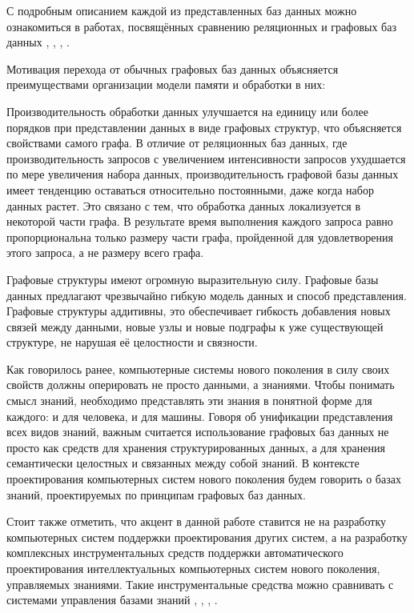 С подробным описанием каждой из представленных баз данных можно ознакомиться в работах, посвящённых сравнению  реляционных и графовых баз данных , , , .

Мотивация перехода от обычных графовых баз данных объясняется преимуществами организации модели памяти и обработки в них:
\begin{textitemize}
    \item Производительность обработки данных улучшается на единицу или более порядков при представлении данных в виде графовых структур, что объясняется свойствами самого графа. В отличие от реляционных баз данных, где производительность запросов с увеличением интенсивности запросов ухудшается по мере увеличения набора данных, производительность графовой базы данных имеет тенденцию оставаться относительно постоянными, даже когда набор данных растет. Это связано с тем, что обработка данных локализуется в некоторой части графа. В результате время выполнения каждого запроса равно пропорциональна только размеру части графа, пройденной для удовлетворения этого запроса, а не размеру всего графа.
    \item Графовые структуры имеют огромную выразительную силу. Графовые базы данных предлагают чрезвычайно гибкую модель данных и способ представления. Графовые структуры аддитивны, это обеспечивает гибкость добавления новых связей между данными, новые узлы и новые подграфы к уже существующей структуре, не нарушая её целостности и связности.
\end{textitemize}

Как говорилось ранее, компьютерные системы нового поколения в силу своих свойств должны оперировать не просто данными, а знаниями. Чтобы понимать смысл знаний, необходимо представлять эти знания в понятной форме для каждого: и для человека, и для машины. Говоря об унификации представления всех видов знаний, важным считается использование графовых баз данных не просто как средств для хранения структурированных данных, а для хранения семантически целостных и связанных между собой знаний. В контексте проектирования компьютерных систем нового поколения будем говорить о базах знаний, проектируемых по принципам графовых баз данных.

Стоит также отметить, что акцент в данной работе ставится не на разработку компьютерных систем поддержки проектирования других систем, а на разработку комплексных инструментальных средств поддержки автоматического проектирования интеллектуальных компьютерных систем нового поколения, управляемых знаниями. Такие инструментальные средства можно сравнивать с системами управления базами знаний , , , .

